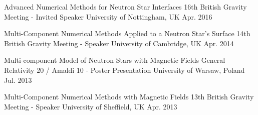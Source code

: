

\begin{cventries}

  \presentry
    {Advanced Numerical Methods for Neutron Star Interfaces} %
    {16th British Gravity Meeting - Invited Speaker} %
    {University of Nottingham, UK} %
    {Apr. 2016} %

\end{cventries}
\begin{cventries}

  \presentry
    {Multi-Component Numerical Methods Applied to a Neutron Star's Surface} %
    {14th British Gravity Meeting - Speaker} %
    {University of Cambridge, UK} %
    {Apr. 2014} %

\end{cventries}
\begin{cventries}

  \presentry
    {Multi-component Model of Neutron Stars with Magnetic Fields} %
    {General Relativity 20 / Amaldi 10 - Poster Presentation} %
    {University of Warsaw, Poland} %
    {Jul. 2013} %
\end{cventries}
\begin{cventries}

  \presentry
    {Multi-Component Numerical Methods with Magnetic Fields} %
    {13th British Gravity Meeting - Speaker} %
    {University of Sheffield, UK} %
    {Apr. 2013} %

\end{cventries}
